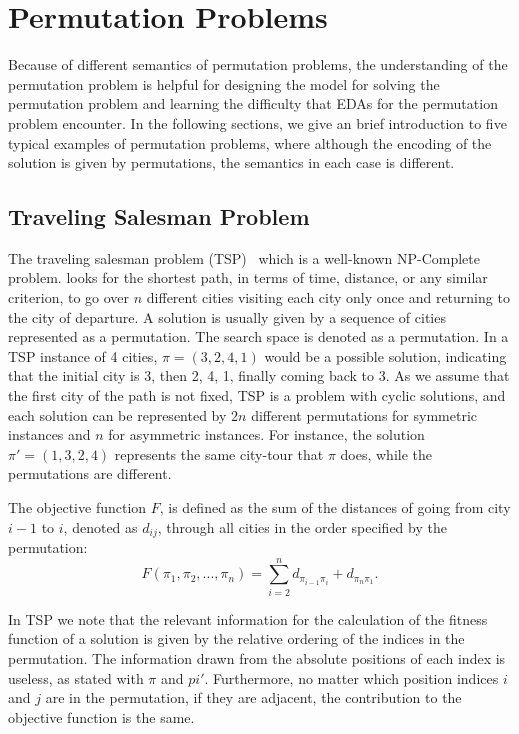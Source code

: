 \section{Permutation Problems}
\label{ch:permutation_problems}

Because of different semantics of permutation problems, the understanding of the permutation problem is helpful for designing the model for solving the permutation problem and learning the difficulty that EDAs for the permutation problem encounter. In the following sections, we give an brief introduction to five typical examples of permutation problems, where although the encoding of the solution is given by permutations, the semantics in each case is different.

\subsection{Traveling Salesman Problem}

The traveling salesman problem (TSP)~\citep{goldberg1985alleles} which is a well-known NP-Complete problem. looks for the shortest path, in terms of time, distance, or any similar criterion, to go over $n$ different cities visiting each city only once and returning to the city of departure. A solution is usually given by a sequence of cities represented as a permutation. The search space is denoted as a permutation.
In a TSP instance of 4 cities, $\pi = (3,2,4,1)$ would be a possible solution, indicating that the initial city is 3, then 2, 4, 1, finally coming back to 3. As we assume that the first city of the path is not fixed, TSP is a problem with cyclic solutions, and each solution can be represented by $2n$ different permutations for symmetric instances and $n$ for asymmetric instances. For instance, the solution ${\pi}'=(1,3,2,4)$ represents the same city-tour that $\pi$ does, while the permutations are different.

The objective function $F$, is defined as the sum of the distances of going from city $i-1$ to $i$, denoted as $d_{ij}$, through all cities in the order specified by the permutation:
\begin{equation*}
	F(\pi_1, \pi_2, ... , \pi_n) = \sum_{i=2}^{n}{d_{\pi_{i-1}\pi_i}} + d_{\pi_n\pi_1} \text{.}
\end{equation*}

In TSP we note that the relevant information for the calculation of the fitness function of a solution is given by the relative ordering of the indices in the permutation. The information drawn from the absolute positions of each index is useless, as stated with $\pi$ and ${pi}'$. Furthermore, no matter which position indices $i$ and $j$ are in the permutation, if they are adjacent, the contribution to the objective function is the same.

